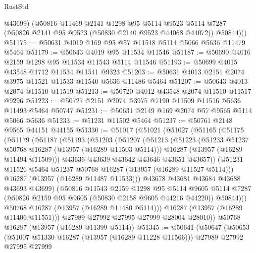 \begin{lexlean}{RustStd}
\begin{coremodule}
          @43699)
        (@50816
          @11469
          @2141
          @1298
          @95
          @5114
          @9523
          @5114
          @7287
          (@50826 @2141 @95 @9523 (@50830 @2140 @9523 @44068 @44072))
          @50844)))
@51175 := @50631 @4019 @169 @95 @57 @11548 @5114 @5066 @5636 @11479 @5464
@51179 := @50643 @4019 @95 @11534 @11546
@51187 := @50690 @4016 @2159 @1298 @95 @11534 @11543 @5114 @11546
@51193 := @50699 @4015 @43548 @1712 @11534 @11541 @9323
@51203 := @50631 @4013 @2151 @2074 @3975 @11521 @11533 @11540 @5636 @11486 @5464
@51207 := @50643 @4013 @2074 @11510 @11519
@51213 := @50720 @4012 @43548 @2074 @11510 @11517 @9296
@51223 := @50727 @2151 @2074 @3975 @7190 @11509 @11516 @5636 @11493 @5464 @50747
@51231 := @50631 @2149 @169 @2074 @57 @9565 @5114 @5066 @5636
@51233 := @51231 @11502 @5464
@51237 := @50761 @2148 @9565 @44151 @44155
@51330 := @51017
    (@51021
      (@51027
        (@51165
          (@51175
            (@51179
              (@51187
                (@51193
                  (@51203
                    (@51207
                      (@51213
                        (@51223
                          (@51233 @51237 @50768 @16287 (@13957 (@16289 @11503 @5114)))
                          @16287
                          (@13957 (@16289 @11494 @11509)))
                        @43636
                        @43639
                        @43642
                        @43646
                        @43651
                        @43657))
                    (@51231 @11526 @5464 @51237 @50768 @16287 (@13957 (@16289 @11527 @5114)))
                    @16287
                    (@13957 (@16289 @11487 @11533)))
                  @43678
                  @43681
                  @43684
                  @43688
                  @43693
                  @43699)
                (@50816
                  @11543
                  @2159
                  @1298
                  @95
                  @5114
                  @9605
                  @5114
                  @7287
                  (@50826 @2159 @95 @9605 (@50830 @2158 @9605 @44216 @44220))
                  @50844)))
            @50768
            @16287
            (@13957 (@16289 @11480 @5114)))
          @16287
          (@13957 (@16289 @11406 @11551)))
        @27989
        @27992
        @27995
        @27999
        @28004
        @28010))
    @50768
    @16287
    (@13957 (@16289 @11399 @5114))
@51345 := @50641
    (@50647
      (@50653
        (@51007 @51330 @16287 (@13957 (@16289 @11228 @11566)))
        @27989
        @27992
        @27995
        @27999

\end{coremodule}
\end{lexlean}
